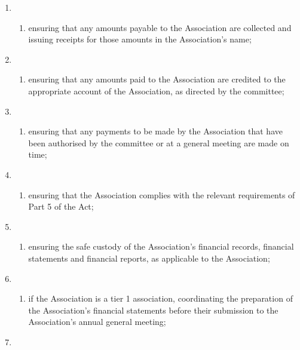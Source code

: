 \documentclass[../constitution.tex]{subfiles}
\begin{document}
\begin{enumerate}
\item \begin{enumerate}
  \def\labelenumi{\alph{enumi})}
  
  \item ensuring that any amounts payable to the Association are collected and issuing receipts for those amounts in the Association's name;
  \end{enumerate}
\item \begin{enumerate}
  \def\labelenumi{\alph{enumi})}
  \setcounter{enumi}{1}
  
  \item ensuring that any amounts paid to the Association are credited to the appropriate account of the Association, as directed by the committee;
  \end{enumerate}
\item \begin{enumerate}
  \def\labelenumi{\alph{enumi})}
  \setcounter{enumi}{2}
  
  \item ensuring that any payments to be made by the Association that have been authorised by the committee or at a general meeting are made on time;
  \end{enumerate}
\item \begin{enumerate}
  \def\labelenumi{\alph{enumi})}
  \setcounter{enumi}{3}
  
  \item ensuring that the Association complies with the relevant requirements of Part 5 of the Act;
  \end{enumerate}
\item \begin{enumerate}
  \def\labelenumi{\alph{enumi})}
  \setcounter{enumi}{4}
  
  \item ensuring the safe custody of the Association's financial records, financial statements and financial reports, as applicable to the Association;
  \end{enumerate}
\item \begin{enumerate}
  \def\labelenumi{\alph{enumi})}
  \setcounter{enumi}{5}
  
  \item if the Association is a tier 1 association, coordinating the preparation of the Association's financial statements before their submission to the Association's annual general meeting;
  \end{enumerate}
\item \begin{enumerate}
  \def\labelenumi{\alph{enumi})}
  \setcounter{enumi}{6}
  

\end{enumerate}
\end{enumerate}
\end{document}
